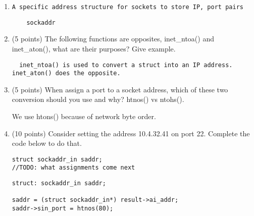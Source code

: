 \documentclass{article}[9pt]
\newenvironment{answerfont}{\fontfamily{qhv}\selectfont}{\par}
\newenvironment{myanswer}{\begin{mdframed}\begin{answerfont}}{\end{answerfont}\end{mdframed}}
\begin{document}
\begin{enumerate}
  \item \texttt{A specific address structure for sockets to store IP, port pairs}
    \begin{myanswer}\begin{verbatim}
    sockaddr
    \end{verbatim}\end{myanswer}

\item (5 points) The following functions are opposites, inet_ntoa() and inet_aton(), what are their purposes? Give example.

  \begin{myanswer}
  \begin{verbatim}
  inet_ntoa() is used to convert a struct into an IP address. inet_aton() does the opposite.
  \end{verbatim}
  \end{myanswer}

\item (5 points) When assign a port to a socket address, which of these two conversion should you use and why? htnos() vs ntohs().

  \begin{myanswer}
  We use htons() because of network byte order.
  \end{myanswer}

\item (10 points) Consider setting the address 10.4.32.41 on port 22. Complete the code below to do that.

\begin{enumerate}
\begin{verbatim}
struct sockaddr_in saddr;
//TODO: what assignments come next
\end{verbatim}
\end{enumerate}

\begin{myanswer}
\begin{verbatim}
struct: sockaddr_in saddr;

saddr = (struct sockaddr_in*) result->ai_addr;
saddr->sin_port = htnos(80);
\end{verbatim}
\end{myanswer}


\end{enumerate}
\end{document}
